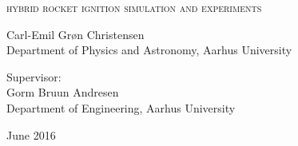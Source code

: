
\begin{titlingpage}

\begin{center}

\vspace*{0cm}
\HUGE
\textsc{hybrid rocket ignition simulation and experiments}\\
\vspace{1.5cm}

%
\vspace{1.2cm}

\large
{
    Carl-Emil Grøn Christensen\\
    Department of Physics and Astronomy, Aarhus University
}

\vspace{1.5cm}

{
  Supervisor:\\
  Gorm Bruun Andresen\\
  Department of Engineering, Aarhus University
}

\vspace{1.5cm}
{June 2016}\\


\end{center}



\end{titlingpage}
